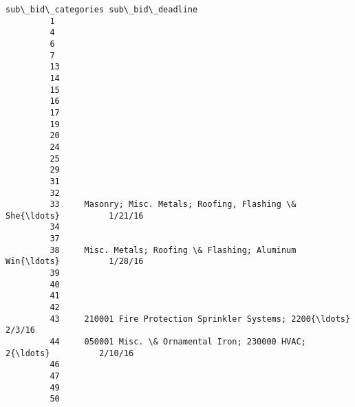 \documentclass[11pt]{article}
\begin{document}
\begin{Verbatim}[commandchars=\\\{\}]
                                               sub\_bid\_categories sub\_bid\_deadline  
         1                                                                          
         4                                                                          
         6                                                                          
         7                                                                          
         13                                                                         
         14                                                                         
         15                                                                         
         16                                                                         
         17                                                                         
         19                                                                         
         20                                                                         
         24                                                                         
         25                                                                         
         29                                                                         
         31                                                                         
         32                                                                         
         33     Masonry; Misc. Metals; Roofing, Flashing \& She{\ldots}          1/21/16  
         34                                                                         
         37                                                                         
         38     Misc. Metals; Roofing \& Flashing; Aluminum Win{\ldots}          1/28/16  
         39                                                                         
         40                                                                         
         41                                                                         
         42                                                                         
         43     210001 Fire Protection Sprinkler Systems; 2200{\ldots}           2/3/16  
         44     050001 Misc. \& Ornamental Iron; 230000 HVAC; 2{\ldots}          2/10/16  
         46                                                                         
         47                                                                         
         49                                                                         
         50                                                                         

\end{Verbatim}
\end{document}
